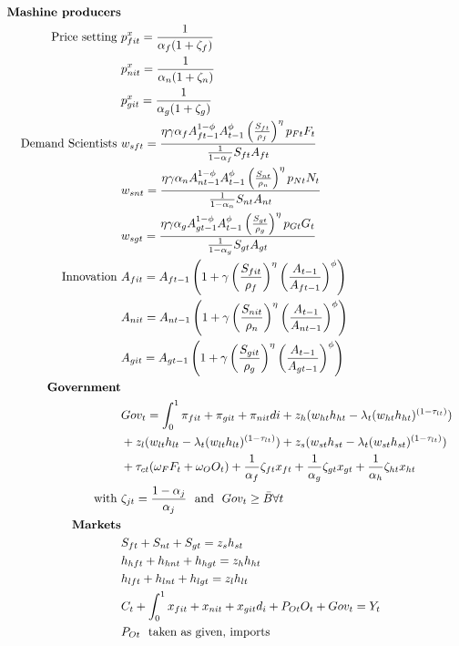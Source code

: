 \begin{align*}
\text{\textbf{Mashine producers}}\\
\text{Price setting}\ \vspace{4mm}&p_{fit}^x=\frac{1}{\alpha_f(1+\zeta_f)}\\
&p_{nit}^x=\frac{1}{\alpha_n(1+\zeta_n)}\\
&p_{git}^x=\frac{1}{\alpha_g(1+\zeta_g)}\\ 
\text{Demand Scientists}\ \vspace{4mm}&
w_{sft}=\frac{\eta \gamma \alpha_f A_{ft-1}^{1-\phi}A_{t-1}^{\phi}\left(\frac{S_{ft}}{\rho_f}\right)^{\eta}p_{Ft}F_t}{\frac{1}{1-\alpha_f}S_{ft}A_{ft}}\\
&
w_{snt}=\frac{\eta \gamma \alpha_n A_{nt-1}^{1-\phi}A_{t-1}^{\phi}\left(\frac{S_{nt}}{\rho_n}\right)^{\eta}p_{Nt}N_t}{\frac{1}{1-\alpha_n}S_{nt}A_{nt}}\\
&
w_{sgt}=\frac{\eta \gamma \alpha_g A_{gt-1}^{1-\phi}A_{t-1}^{\phi}\left(\frac{S_{gt}}{\rho_g}\right)^{\eta}p_{Gt}G_t}{\frac{1}{1-\alpha_g}S_{gt}A_{gt}}\\
\text{Innovation}\ \vspace{4mm}&
A_{fit}=A_{ft-1}\left(1+\gamma\left(\frac{S_{fit}}{\rho_f}\right)^{\eta}\left(\frac{A_{t-1}}{A_{ft-1}}\right)^{\phi}\right) \\
&
A_{nit}=A_{nt-1}\left(1+\gamma\left(\frac{S_{nit}}{\rho_n}\right)^{\eta}\left(\frac{A_{t-1}}{A_{nt-1}}\right)^{\phi}\right) \\
&
A_{git}=A_{gt-1}\left(1+\gamma\left(\frac{S_{git}}{\rho_g}\right)^{\eta}\left(\frac{A_{t-1}}{A_{gt-1}}\right)^{\phi}\right) \\
\text{\textbf{Government}}&\\
&Gov_t=\int_{0}^{1}\pi_{fit}+\pi_{git}+\pi_{nit}di+z_h(w_{ht}h_{ht}-\lambda_t(w_{ht}h_{ht})^{(1-\tau_{lt})})\\&+z_l(w_{lt}h_{lt}-\lambda_t(w_{lt}h_{lt})^{(1-\tau_{lt})})+z_s(w_{st}h_{st}-\lambda_t(w_{st}h_{st})^{(1-\tau_{lt})})\\ &+\tau_{ct}(\omega_FF_t+\omega_OO_t) + \frac{1}{\alpha_f}\zeta_{ft}x_{ft}+\frac{1}{\alpha_g}\zeta_{gt}x_{gt}+ \frac{1}{\alpha_h}\zeta_{ht}x_{ht}\\
\text{with}\ \vspace{4mm}&\zeta_{jt}=\frac{1-\alpha_j}{\alpha_j}\ \ \text{and} \ \ Gov_t\geq \bar{B} \forall t\\
\text{\textbf{Markets}}&\\
& S_{ft}+ S_{nt}+ S_{gt}=z_sh_{st}\\
&h_{hft}+h_{hnt}+h_{hgt}=z_{h} h_{ht}\\
&h_{lft}+h_{lnt}+h_{lgt}=z_{l} h_{lt}\\
&C_{t}+\int_{0}^{1} x_{fit}+x_{nit}+x_{git}d_i+P_{Ot}O_t+Gov_t=Y_t\\
&P_{Ot}\ \ \text{taken as given, imports}
\end{align*}

